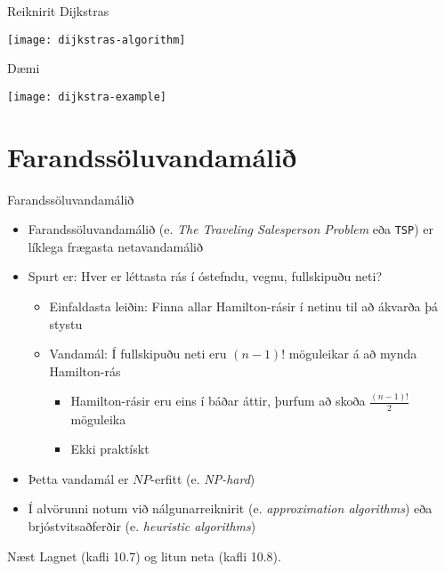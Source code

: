 \documentclass{beamer}
\begin{document}
\begin{frame}{Reiknirit Dijkstras}
\begin{center}
\texttt{[image: dijkstras-algorithm]}
\end{center}
\end{frame}

\begin{frame}{Dæmi}
\begin{center}
\texttt{[image: dijkstra-example]}
\end{center}
\end{frame}

\section{Farandssöluvandamálið}

\begin{frame}{Farandssöluvandamálið}
\begin{itemize}
 \item Farandssöluvandamálið (e. \emph{The Traveling Salesperson Problem} eða \texttt{TSP}) er líklega frægasta netavandamálið
 \item Spurt er: Hver er léttasta rás í óstefndu, vegnu, fullskipuðu neti? \pause
 \begin{itemize}
  \item Einfaldasta leiðin: Finna allar Hamilton-rásir í netinu til að ákvarða þá stystu
  \item Vandamál: Í fullskipuðu neti eru $(n-1)!$ möguleikar á að mynda Hamilton-rás
  \begin{itemize}
   \item Hamilton-rásir eru eins í báðar áttir, þurfum að skoða $\frac{(n-1)!}{2}$ möguleika
   \item Ekki praktískt
  \end{itemize}
 \end{itemize}
 \item Þetta vandamál er $NP$-erfitt (e. \emph{NP-hard})
 \item Í alvörunni notum við nálgunarreiknirit (e. \emph{approximation algorithms}) eða brjóstvitsaðferðir (e. \emph{heuristic algorithms})
\end{itemize}
\end{frame}


\begin{frame}{Næst}
Lagnet (kafli 10.7) og litun neta (kafli 10.8).
\end{frame}
\end{document}
